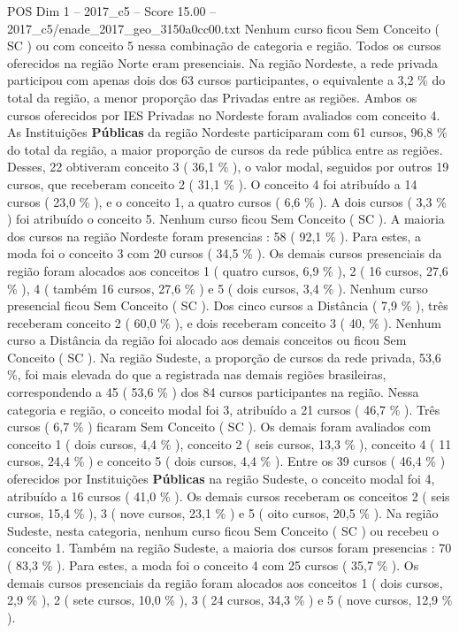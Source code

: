 \begin{textsample}{POS Dim 1 – 2017\_c5 – Score 15.00 – 2017\_c5/enade\_2017\_geo\_3150a0cc00.txt}
Nenhum curso ficou Sem Conceito ( SC ) ou com conceito 5 nessa combinação de categoria e região.
Todos os cursos oferecidos na região Norte eram presenciais.
Na região Nordeste, a rede privada participou com apenas dois dos 63 cursos participantes, o equivalente a 3,2 \% do total da região, a menor proporção das Privadas entre as regiões.
Ambos os cursos oferecidos por IES Privadas no Nordeste foram avaliados com conceito 4.
As Instituições \textbf{Públicas} da região Nordeste participaram com 61 cursos, 96,8 \% do total da região, a maior proporção de cursos da rede pública entre as regiões.
Desses, 22 obtiveram conceito 3 ( 36,1 \% ), o valor modal, seguidos por outros 19 cursos, que receberam conceito 2 ( 31,1 \% ).
O conceito 4 foi atribuído a 14 cursos ( 23,0 \% ), e o conceito 1, a quatro cursos ( 6,6 \% ).
A dois cursos ( 3,3 \% ) foi atribuído o conceito 5.
Nenhum curso ficou Sem Conceito ( SC ).
A maioria dos cursos na região Nordeste foram presencias : 58 ( 92,1 \% ).
Para estes, a moda foi o conceito 3 com 20 cursos ( 34,5 \% ).
Os demais cursos presenciais da região foram alocados aos conceitos 1 ( quatro cursos, 6,9 \% ), 2 ( 16 cursos, 27,6 \% ), 4 ( também 16 cursos, 27,6 \% ) e 5 ( dois cursos, 3,4 \% ).
Nenhum curso presencial ficou Sem Conceito ( SC ).
Dos cinco cursos a Distância ( 7,9 \% ), três receberam conceito 2 ( 60,0 \% ), e dois receberam conceito 3 ( 40, \% ).
Nenhum curso a Distância da região foi alocado aos demais conceitos ou ficou Sem Conceito ( SC ).
Na região Sudeste, a proporção de cursos da rede privada, 53,6 \%, foi mais elevada do que a registrada nas demais regiões brasileiras, correspondendo a 45 ( 53,6 \% ) dos 84 cursos participantes na região.
Nessa categoria e região, o conceito modal foi 3, atribuído a 21 cursos ( 46,7 \% ).
Três cursos ( 6,7 \% ) ficaram Sem Conceito ( SC ).
Os demais foram avaliados com conceito 1 ( dois cursos, 4,4 \% ), conceito 2 ( seis cursos, 13,3 \% ), conceito 4 ( 11 cursos, 24,4 \% ) e conceito 5 ( dois cursos, 4,4 \% ).
Entre os 39 cursos ( 46,4 \% ) oferecidos por Instituições \textbf{Públicas} na região Sudeste, o conceito modal foi 4, atribuído a 16 cursos ( 41,0 \% ).
Os demais cursos receberam os conceitos 2 ( seis cursos, 15,4 \% ), 3 ( nove cursos, 23,1 \% ) e 5 ( oito cursos, 20,5 \% ).
Na região Sudeste, nesta categoria, nenhum curso ficou Sem Conceito ( SC ) ou recebeu o conceito 1.
Também na região Sudeste, a maioria dos cursos foram presencias : 70 ( 83,3 \% ).
Para estes, a moda foi o conceito 4 com 25 cursos ( 35,7 \% ).
Os demais cursos presenciais da região foram alocados aos conceitos 1 ( dois cursos, 2,9 \% ), 2 ( sete cursos, 10,0 \% ), 3 ( 24 cursos, 34,3 \% ) e 5 ( nove cursos, 12,9 \% ).

\end{textsample}

